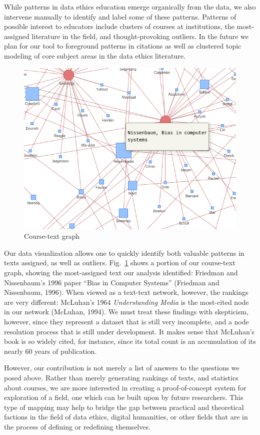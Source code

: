 \documentclass[
]{article}
\begin{document}
While patterns in data ethics education emerge organically from the
data, we also intervene manually to identify and label some of these
patterns. Patterns of possible interest to educators include clusters of
courses at institutions, the most-assigned literature in the field, and
thought-provoking outliers. In the future we plan for our tool to
foreground patterns in citations as well as clustered topic modeling of
core subject areas in the data ethics literature.

\begin{figure}
\hypertarget{fig:graph}{%
\centering
\includegraphics{course-text.png}
\caption{Course-text graph}\label{fig:graph}
}
\end{figure}

Our data visualization allows one to quickly identify both valuable
patterns in texts assigned, as well as outliers. Fig.~\ref{fig:graph}
shows a portion of our course-text graph, showing the most-assigned text
our analysis identified: Friedman and Nissenbaum's 1996 paper ``Bias in
Computer Systems'' (Friedman and Nissenbaum, 1996). When viewed as a
text-text network, however, the rankings are very different: McLuhan's
1964 \emph{Understanding Media} is the most-cited node in our network
(McLuhan, 1994). We must treat these findings with skepticism, however,
since they represent a dataset that is still very incomplete, and a node
resolution process that is still under development. It makes sense that
McLuhan's book is so widely cited, for instance, since its total count
is an accumulation of its nearly 60 years of publication.

However, our contribution is not merely a list of answers to the
questions we posed above. Rather than merely generating rankings of
texts, and statistics about courses, we are more interested in creating
a proof-of-concept system for exploration of a field, one which can be
built upon by future researchers. This type of mapping may help to
bridge the gap between practical and theoretical factions in the field
of data ethics, digital humanities, or other fields that are in the
process of defining or redefining themselves.
\end{document}
